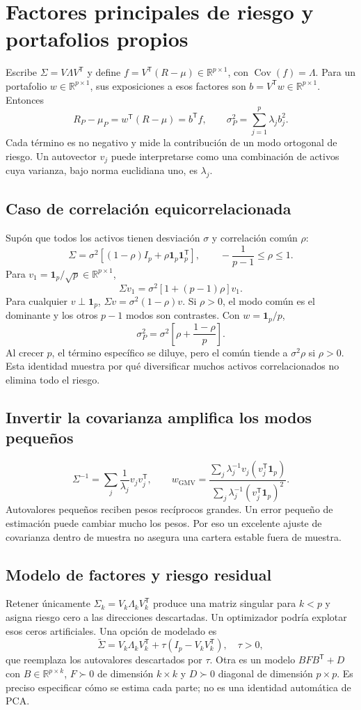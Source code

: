 \documentclass[11pt,a4paper]{article}
\newcommand{\R}{\mathbb R}
\newcommand{\T}{^{\mathsf T}}
\DeclareMathOperator{\Cov}{Cov}
\newcommand{\ones}{\mathbf 1}
\theoremstyle{definition}
\begin{document}
\section{Factores principales de riesgo y portafolios propios}
Escribe $\Sigma=V\Lambda V\T$ y define $f=V\T(R-\mu)\in\R^{p\times1}$, con $\Cov(f)=\Lambda$. Para un portafolio $w\in\R^{p\times1}$, sus exposiciones a esos factores son $b=V\T w\in\R^{p\times1}$. Entonces
\[
R_P-\mu_P=w\T(R-\mu)=b\T f,\qquad
\boxed{\sigma_P^2=\sum_{j=1}^p\lambda_jb_j^2}.
\]
Cada término es no negativo y mide la contribución de un modo ortogonal de riesgo. Un autovector $v_j$ puede interpretarse como una combinación de activos cuya varianza, bajo norma euclidiana uno, es $\lambda_j$.
\subsection{Caso de correlación equicorrelacionada}
Supón que todos los activos tienen desviación $\sigma$ y correlación común $\rho$:
\[
\Sigma=\sigma^2[(1-\rho)I_p+\rho\ones_p\ones_p\T],\qquad -\frac1{p-1}\le\rho\le1.
\]
Para $v_1=\ones_p/\sqrt p\in\R^{p\times1}$,
\[
\Sigma v_1=\sigma^2[1+(p-1)\rho]v_1.
\]
Para cualquier $v\perp\ones_p$, $\Sigma v=\sigma^2(1-\rho)v$. Si $\rho>0$, el modo común es el dominante y los otros $p-1$ modos son contrastes. Con $w=\ones_p/p$,
\[
\sigma_P^2=\sigma^2\left[\rho+\frac{1-\rho}{p}\right].
\]
Al crecer $p$, el término específico se diluye, pero el común tiende a $\sigma^2\rho$ si $\rho>0$. Esta identidad muestra por qué diversificar muchos activos correlacionados no elimina todo el riesgo.
\subsection{Invertir la covarianza amplifica los modos pequeños}
\[
\Sigma^{-1}=\sum_j\frac1{\lambda_j}v_jv_j\T,\qquad
w_{\mathrm{GMV}}=\frac{\sum_j\lambda_j^{-1}v_j(v_j\T\ones_p)}{\sum_j\lambda_j^{-1}(v_j\T\ones_p)^2}.
\]
Autovalores pequeños reciben pesos recíprocos grandes. Un error pequeño de estimación puede cambiar mucho los pesos. Por eso un excelente ajuste de covarianza dentro de muestra no asegura una cartera estable fuera de muestra.
\subsection{Modelo de factores y riesgo residual}
Retener únicamente $\Sigma_k=V_k\Lambda_kV_k\T$ produce una matriz singular para $k<p$ y asigna riesgo cero a las direcciones descartadas. Un optimizador podría explotar esos ceros artificiales. Una opción de modelado es
\[
\widetilde\Sigma=V_k\Lambda_kV_k\T+\tau(I_p-V_kV_k\T),\quad \tau>0,
\]
que reemplaza los autovalores descartados por $\tau$. Otra es un modelo $BFB\T+D$ con $B\in\R^{p\times k}$, $F\succ0$ de dimensión $k\times k$ y $D\succ0$ diagonal de dimensión $p\times p$. Es preciso especificar cómo se estima cada parte; no es una identidad automática de PCA.
\end{document}
